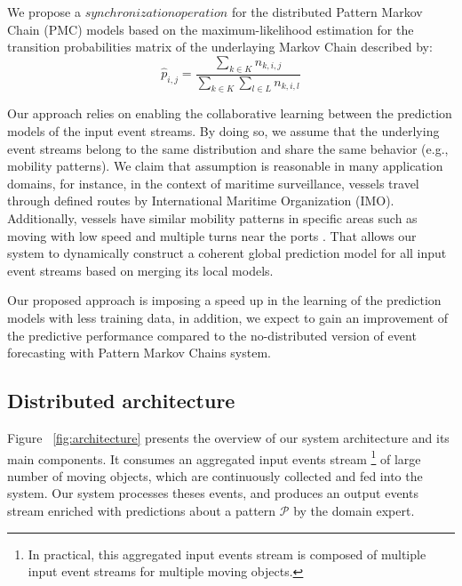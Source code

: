 \par We propose a $synchronization operation$  for the distributed Pattern Markov Chain (PMC) models based on the maximum-likelihood estimation \citep{anderson1957statistical} for the transition probabilities matrix of the underlaying Markov Chain described by: 
\begin{equation}
\label{eq:pi_estim}
\hat{p}_{i,j}=\frac{\sum_{k \in K} n_{k,i,j}}{\sum_{k \in K} \sum_{l \in L} n_{k,i,l}}
\end{equation}


\par Our approach relies on enabling the collaborative learning between the prediction models of  the input event streams. By doing so, we assume that the underlying event streams belong to the same  distribution and share the same behavior (e.g., mobility patterns). We claim that assumption is reasonable in many application domains, for instance, in the context of maritime surveillance, vessels travel through defined routes by International Maritime Organization (IMO). Additionally, vessels have similar mobility patterns in specific areas such as moving with low speed and multiple turns near the ports \cite{pallotta2013vessel,liu2014knowledge}. That allows our system to dynamically construct a coherent global prediction model for all input event streams based on merging its local models.

\par Our proposed approach is imposing a speed up in the learning of the prediction models with less training data, in addition, we expect to gain an improvement of the predictive performance compared to the no-distributed  version of event forecasting with Pattern Markov Chains system. 


\subsection{Distributed architecture}

Figure ~\ref{fig:architecture} presents the overview of our system architecture and its main components. It consumes an aggregated input events stream \footnote{In practical, this aggregated input events stream is composed of multiple input event streams for multiple moving objects.} of large number of moving objects, which are continuously collected and fed into the system. Our system processes theses events, and produces an output events stream enriched with predictions about a  pattern $\mathcal{P}$ by the domain expert. 


